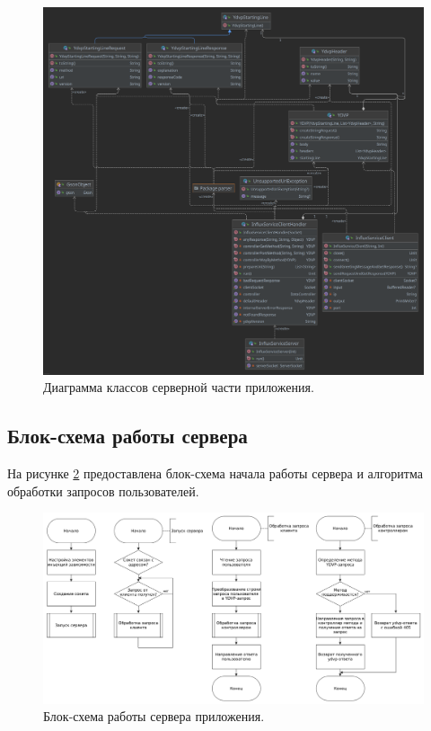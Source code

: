 \begin{figure}[hbtp]
	\centering
	\includegraphics[width=\textwidth]{img/serverDiagram.png}
	\caption{Диаграмма классов серверной части приложения. }
	\label{fig:serverAndProtocol}
\end{figure}
\pagebreak

\subsection{Блок-схема работы сервера}
На рисунке \ref{fig:serverScheme} предоставлена блок-схема начала работы сервера и алгоритма обработки запросов пользователей.

\begin{figure}[hbtp]
	\centering
	\includegraphics[width=\textwidth]{img/serverScheme.png}
	\caption{Блок-схема работы сервера приложения. }
	\label{fig:serverScheme}
\end{figure}
\pagebreak

\pagebreak